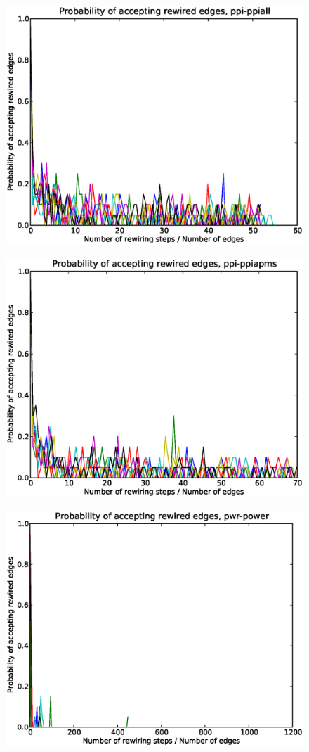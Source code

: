 \documentclass[12pt]{article}
\begin{document}
\begin{figure}[p]
\includegraphics[scale=0.75]{Paccept-ppi-ppiall.eps}\\
\end{figure}


\begin{figure}[p]
\includegraphics[scale=0.75]{Paccept-ppi-ppiapms.eps}\\
\end{figure}


\begin{figure}[p]
\includegraphics[scale=0.75]{Paccept-pwr-power.eps}\\
\end{figure}
\end{document}
